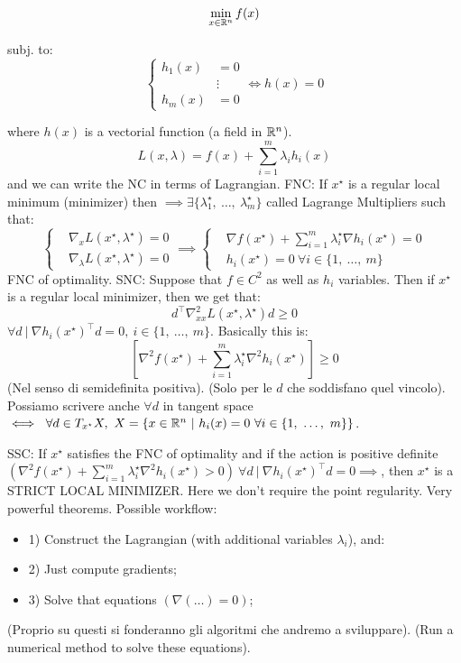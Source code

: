 \[
	\min_{x\in\mathbb{R}^n}{f(x)}
\]

subj. to:
\[
	\left\{
	\begin{aligned}
	h_1(x) &= 0\\
		   &\vdots\\
	h_m(x) &= 0
	\end{aligned}
	\right. \iff h(x)=0
\]

where $h(x)$ is a vectorial function (a field in $\mathbb{R}^n$).
\[
	L(x,\lambda) = f(x) + \sum_{i=1}^m{\lambda_ih_i(x)}
\]
and we can write the NC in terms of Lagrangian.
FNC: If $x^\star$ is a regular local minimum (minimizer) then $\implies \exists \{\lambda_1^\star,\ \dots,\ \lambda_m^\star\}$ called Lagrange Multipliers such that:
\[
	\left\{
	\begin{aligned}
	&\nabla_x{L(x^\star,\lambda^\star)} = 0\\
	&\nabla_\lambda{L(x^\star,\lambda^\star)} = 0
	\end{aligned}
	\right. \implies 
	\left\{
	\begin{aligned}
	&\nabla{f(x^\star)} + \sum_{i=1}^m{\lambda_i^\star\nabla{h_i(x^\star)}} = 0\\
	&h_i(x^\star) = 0\ \forall i\in\{1,\ \dots,\ m\}
	\end{aligned}
	\right.
\]
FNC of optimality. 
SNC: Suppose that $f\in C^2$ as well as $h_i$ variables. Then if $x^\star$ is a regular local minimizer, then we get that:
\[
	d^\top\nabla_{xx}^2{L(x^\star,\lambda^\star)}d \geq 0
\]
$\forall d\ |\ \nabla{h_i(x^\star)}^\top d = 0,\ i\in\{1,\ \dots,\ m\}$.
Basically this is:
\[
	[\nabla^2{f(x^\star)} + \sum_{i=1}^m{\lambda_i^\star\nabla^2{h_i(x^\star)}}] \geq 0
\]
(Nel senso di semidefinita positiva). (Solo per le $d$ che soddisfano quel vincolo). Possiamo scrivere anche $\forall d$ in tangent space $\iff\ \forall d \in T_{x^\star}X,\ X=\{x\in\R^n\ |\ h_i(x)=0\ \forall i\in\{1,\ \dots,\ m\}\}$.

SSC: If $x^\star$ satisfies the FNC of optimality and if the action is positive definite $(\nabla^2{f(x^\star)} + \sum_{i=1}^m{\lambda_i^\star\nabla^2{h_i(x^\star)}} > 0)\ \forall d\ |\ \nabla{h_i(x^\star)}^\top d = 0 \implies$, then $x^\star$ is a STRICT LOCAL MINIMIZER. Here we don't require the point regularity. Very powerful theorems. Possible workflow:
\begin{itemize}
\item{1)} Construct the Lagrangian (with additional variables $\lambda_i$), and:
\item{2)} Just compute gradients;
\item{3)} Solve that equations $(\nabla(\dots) = 0)$;
\end{itemize}
(Proprio su questi si fonderanno gli algoritmi che andremo a sviluppare). (Run a numerical method to solve these equations).

